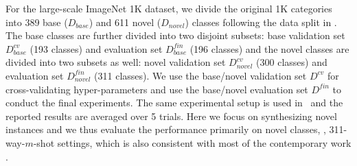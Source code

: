 \documentclass[10pt,letterpaper,twocolumn]{article}
\begin{document}
For the large-scale ImageNet 1K dataset, we divide the original
1K categories into 389 base ($D_{base}$) and 611 novel ($D_{novel}$)
classes following the data split in \cite{2017ICCVaug}. The base classes are further divided into two disjoint
subsets: base validation set $D_{base}^{cv}$ (193 classes) and
evaluation set $D_{base}^{fin}$ (196 classes) and the novel classes
are divided into two subsets as well: novel validation set $D_{novel}^{cv}$
(300 classes) and evaluation set $D_{novel}^{fin}$ (311 classes).
We use the base/novel validation set $D^{cv}$ for cross-validating
hyper-parameters and use the base/novel evaluation set $D^{fin}$
to conduct the final experiments. The same experimental setup is used
in~\cite{2017ICCVaug} and the reported results are averaged over
5 trials. Here we focus on synthesizing novel instances and we thus
evaluate the performance primarily on novel classes, \ie,
311-way-$m$-shot settings, which is also consistent with most of the
contemporary work \cite{matchingnet_1shot,prototype_network,Sachin2017}.
\end{document}
